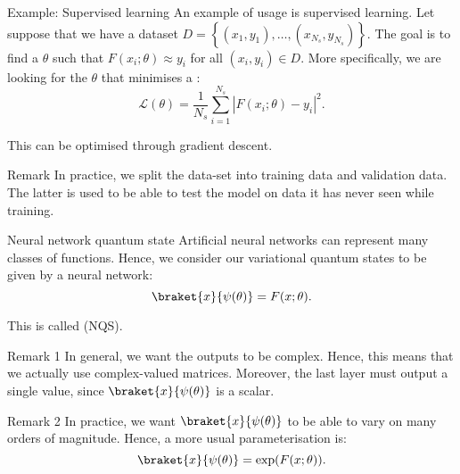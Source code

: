 \documentclass[a4paper]{article}
\begin{document}
\begin{parag}{Example: Supervised learning}
    An example of usage is supervised learning. Let suppose that we have a dataset $D = \left\{\left(x_1, y_1\right), \ldots, \left(x_{N_s}, y_{N_s}\right)\right\}$. The goal is to find a $\theta$ such that $F\left(x_i; \theta\right) \approx y_i$ for all $\left(x_i, y_i\right) \in D$. More specifically, we are looking for the $\theta$ that minimises a : 
    \[\mathcal{L}\left(\theta\right) = \frac{1}{N_s}\sum_{i=1}^{N_s} \left|F\left(x_i; \theta\right) - y_i\right|^2.\]
    
    This can be optimised through gradient descent.

    \begin{subparag}{Remark}
        In practice, we split the data-set into training data and validation data. The latter is used to be able to test the model on data it has never seen while training.
    \end{subparag}
\end{parag}

\begin{parag}{Neural network quantum state}
   Artificial neural networks can represent many classes of functions. Hence, we consider our variational quantum states to be given by a neural network: 
   \[\braket{x}{\psi\left(\theta\right)} = F\left(x; \theta\right).\]
   
   This is called  (NQS).

   \begin{subparag}{Remark 1}
       In general, we want the outputs to be complex. Hence, this means that we actually use complex-valued matrices. Moreover, the last layer must output a single value, since $\braket{x}{\psi\left(\theta\right)}$ is a scalar.
   \end{subparag}

   \begin{subparag}{Remark 2}
       In practice, we want $\braket{x}{\psi\left(\theta\right)}$ to be able to vary on many orders of magnitude. Hence, a more usual parameterisation is: 
       \[\braket{x}{\psi\left(\theta\right)} = \exp\left(F\left(x; \theta\right)\right).\]
   \end{subparag}
\end{parag}
\end{document}
